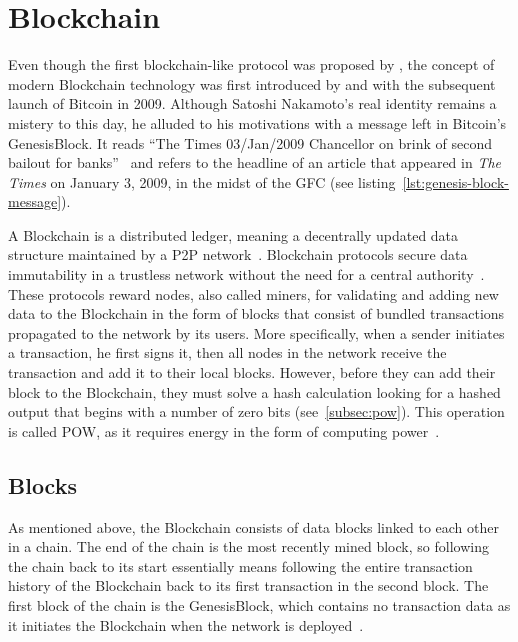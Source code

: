 \section{Blockchain}\label{sec:blockchain}

Even though the first blockchain-like protocol was proposed by \textcite{chaum_computer_1982}, the concept of modern \gls{Blockchain} technology was first introduced by \textcite{nakamoto_bitcoin_2008} and with the subsequent launch of Bitcoin in 2009.
Although Satoshi Nakamoto's real identity remains a mistery to this day, he alluded to his motivations with a message left in Bitcoin's \gls{GenesisBlock}.
It reads \enquote{The Times 03/Jan/2009 Chancellor on brink of second bailout for banks}~\autocite{nakamoto_bitcoin_2009} and refers to the headline of an article that appeared in \emph{The Times} on January 3, 2009, in the midst of the \gls{GFC} (see listing~\ref{lst:genesis-block-message}).


A \gls{Blockchain} is a distributed ledger, meaning a decentrally updated data structure maintained by a \gls{P2P} network~\autocites[3]{crosby_blockchain_2015}[1]{nakamoto_bitcoin_2008}.
\Gls{Blockchain} protocols secure data immutability in a trustless network without the need for a central authority~\autocites[3]{crosby_blockchain_2015}[4]{jafar_blockchain_2021}.
These protocols reward nodes, also called miners, for validating and adding new data to the \gls{Blockchain} in the form of blocks that consist of bundled transactions propagated to the network by its users.
More specifically, when a sender initiates a transaction, he first signs it, then all nodes in the network receive the transaction and add it to their local blocks.
However, before they can add their block to the \gls{Blockchain}, they must solve a hash calculation looking for a hashed output that begins with a number of zero bits (see~\cref{subsec:pow}).
This operation is called \gls{POW}, as it requires energy in the form of computing power~\autocite[3]{nakamoto_bitcoin_2008}.

\subsection{Blocks}\label{subsec:blocks}

As mentioned above, the \gls{Blockchain} consists of data blocks linked to each other in a chain.
The end of the chain is the most recently mined block, so following the chain back to its start essentially means following the entire transaction history of the \gls{Blockchain} back to its first transaction in the second block.
The first block of the chain is the \gls{GenesisBlock}, which contains no transaction data as it initiates the \gls{Blockchain} when the network is deployed~\autocites[162]{antonopoulos_mastering_2017}[31]{antonopoulos_mastering_2019}.

